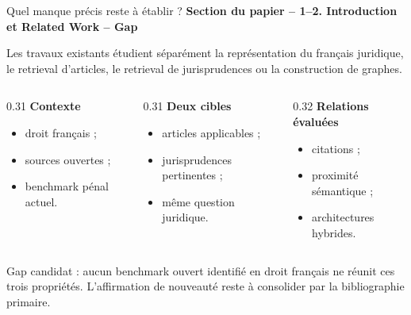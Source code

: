 \documentclass[aspectratio=169,10pt]{beamer}
\newcommand{\keybox}[1]{%
  \begin{center}
  \colorbox{accentsoft}{\parbox{0.92\linewidth}{\centering #1}}
  \end{center}}
\newcommand{\decisionbox}[1]{%
  \begin{center}
  \colorbox{orange!14}{\parbox{0.92\linewidth}{\centering\color{warning} #1}}
  \end{center}}
\newcommand{\papersection}[1]{%
  {\scriptsize\textcolor{accent}{\textbf{Section du papier -- #1}}}\par\vspace{0.55em}}
\begin{document}
\begin{frame}{Quel manque précis reste à établir ?}
  \papersection{1--2. Introduction et Related Work -- Gap}
  \footnotesize
  \keybox{\small Les travaux existants étudient séparément la représentation du français juridique,
  le retrieval d'articles, le retrieval de jurisprudences ou la construction de graphes.}

  \vspace{0.7em}
  \begin{columns}[T,onlytextwidth]
    \begin{column}{0.31\textwidth}
      \textbf{\color{accent}Contexte}
      \begin{itemize}\setlength{\itemsep}{0.35em}
        \item droit français ;
        \item sources ouvertes ;
        \item benchmark pénal actuel.
      \end{itemize}
    \end{column}
    \begin{column}{0.31\textwidth}
      \textbf{\color{ok}Deux cibles}
      \begin{itemize}\setlength{\itemsep}{0.35em}
        \item articles applicables ;
        \item jurisprudences pertinentes ;
        \item même question juridique.
      \end{itemize}
    \end{column}
    \begin{column}{0.32\textwidth}
      \textbf{\color{crosscol}Relations évaluées}
      \begin{itemize}\setlength{\itemsep}{0.35em}
        \item citations ;
        \item proximité sémantique ;
        \item architectures hybrides.
      \end{itemize}
    \end{column}
  \end{columns}

  \vspace{0.7em}
  \decisionbox{\scriptsize Gap candidat : aucun benchmark ouvert identifié en droit français
  ne réunit ces trois propriétés. L'affirmation de nouveauté reste à consolider par la bibliographie primaire.}
\end{frame}
\end{document}
